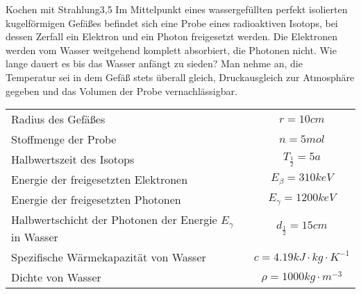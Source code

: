 \begin{problem}{Kochen mit Strahlung}{3,5}
Im Mittelpunkt eines wassergefüllten perfekt isolierten kugelförmigen Gefäßes befindet sich eine Probe eines radioaktiven Isotops, bei dessen Zerfall ein Elektron und ein Photon freigesetzt werden. Die Elektronen werden vom Wasser weitgehend komplett absorbiert, die Photonen nicht. Wie lange dauert es bis das Wasser anfängt zu sieden? Man nehme an, die Temperatur sei in dem Gefäß stets überall gleich, Druckausgleich zur Atmosphäre gegeben und das Volumen der Probe vernachlässigbar.
\begin{center}
\begin{tabular}{lc}
\toprule
Radius des Gefäßes & $r = 10 \unit{cm}$\\
Stoffmenge der Probe & $n = 5 \unit{mol}$\\
Halbwertszeit des Isotops & $T_{\frac12} = 5 \unit{a}$\\
Energie der freigesetzten Elektronen & $E_\beta = 310 \unit{keV}$\\
Energie der freigesetzten Photonen & $E_\gamma = 1200 \unit{keV}$\\
Halbwertschicht der Photonen der Energie $E_\gamma$ in Wasser & $d_{\frac12} = 15 \unit{cm}$\\
Spezifische Wärmekapazität von Wasser & $c = 4.19 \unit{kJ \cdot kg \cdot K^{-1}}$\\
Dichte von Wasser & $\rho = 1000 \unit{kg \cdot m^{-3}}$\\
\bottomrule
\end{tabular}
\end{center}
\end{problem}


